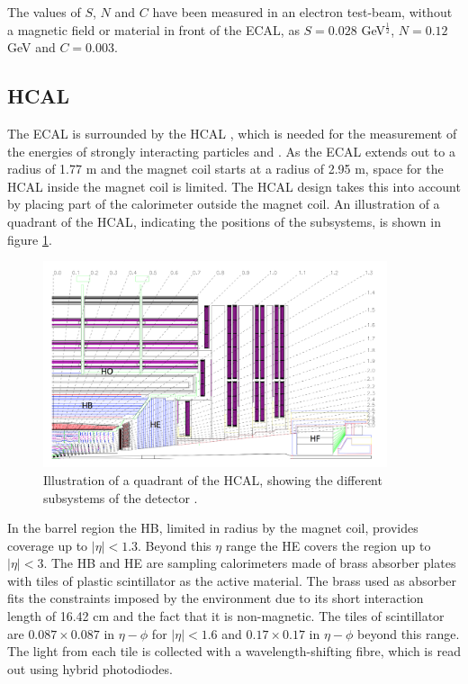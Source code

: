 The values of $S$, $N$ and $C$ have been measured in an electron
test-beam, without a magnetic field or material in front of the \ac{ECAL}, as 
$S = 0.028$ GeV$^{\frac{1}{2}}$, $N = 0.12$ GeV and $C= 0.003$.



\subsection{\acl{HCAL}}
\label{sec:CMSLHC_CMS_hcal}
The \ac{ECAL} is surrounded by the \ac{HCAL} \cite{cms-jinst}, which is needed for the
measurement of the energies of strongly interacting particles and \MET. As
the \ac{ECAL} extends out to a radius of 1.77 m and the magnet coil
starts at a radius of 2.95 m, space for the \ac{HCAL} inside the magnet
coil is limited. The \ac{HCAL} design takes
this into account by placing part of the calorimeter outside the magnet coil. An
illustration of a quadrant of the
\ac{HCAL}, indicating the positions of the subsystems, is shown
in figure \ref{fig:CMS_HCAL}.

\begin{figure}[h!]
\begin{center}
\includegraphics[width=0.9\textwidth]{./Detector/Plots/HCAL.png}
\caption{Illustration of a quadrant of the \ac{HCAL}, showing the different
subsystems of the detector \cite{cms-jinst}.}
\label{fig:CMS_HCAL}
\end{center}
\end{figure}

In the barrel region the \ac{HB}, limited in radius by the magnet coil, provides
coverage up to $|\eta|<1.3$. Beyond this $\eta$ range the \ac{HE} covers
the region up to $|\eta|<3$. The \ac{HB} and \ac{HE} are sampling calorimeters made of brass absorber
plates with tiles of plastic scintillator as the active material. The brass used as 
absorber fits the constraints imposed by the environment due to its short interaction length
of 16.42 cm and the fact that it is non-magnetic. The tiles of scintillator 
are $0.087 \times 0.087$ in $\eta-\phi$ for $|\eta|<1.6$ and $0.17\times0.17$ in $\eta-\phi$
beyond this range. The light from each tile is collected with a wavelength-shifting fibre, 
which is read out using hybrid photodiodes. 

